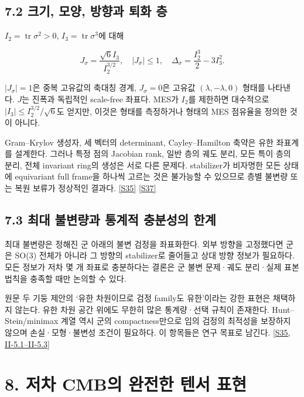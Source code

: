 \documentclass[11pt,a4paper]{article}
\begin{document}
\subsection*{7.2 크기, 모양, 방향과 퇴화 층}

\(I_2=\operatorname{tr}\sigma^2>0\), \(I_3=\operatorname{tr}\sigma^3\)에 대해


\[
J_\sigma=\frac{\sqrt6 I_3}{I_2^{3/2}},\quad |J_\sigma|\le1,
\quad \Delta_\sigma=\frac{I_2^3}{2}-3I_3^2.
\]

\(|J_\sigma|=1\)은 중복 고유값의 축대칭 경계, \(J_\sigma=0\)은 고유값 \((\lambda,-\lambda,0)\) 형태를 나타낸다. \(J\)는 진폭과 독립적인 scale-free 좌표다. MES가 \(I_2\)를 제한하면 대수적으로 \(|I_3|\le I_2^{3/2}/\sqrt6\)도 얻지만, 이것은 형태를 측정하거나 형태의 MES 점유율을 정의한 것이 아니다.


Gram–Krylov 생성자, 세 벡터의 determinant, Cayley–Hamilton 축약은 유한 좌표계를 설계한다. 그러나 특정 점의 Jacobian rank, 일반 층의 궤도 분리, 모든 특이 층의 분리, 전체 invariant ring의 생성은 서로 다른 문제다. stabilizer가 비자명한 모든 상태에 equivariant full frame을 하나씩 고르는 것은 불가능할 수 있으므로 층별 불변량 또는 복원 보류가 정상적인 결과다. \hyperlink{src:S35}{[S35]} \hyperlink{src:S37}{[S37]}


\subsection*{7.3 최대 불변량과 통계적 충분성의 한계}

최대 불변량은 정해진 군 아래의 불변 검정을 좌표화한다. 외부 방향을 고정했다면 군은 SO(3) 전체가 아니라 그 방향의 stabilizer로 줄어들고 상대 방향 정보가 필요하다. 모든 정보가 저차 몇 개 좌표로 충분하다는 결론은 군 불변 문제·궤도 분리·실제 표본법칙을 충족할 때만 논의할 수 있다.


원문 두 기둥 제안의 ‘유한 차원이므로 검정 family도 유한’이라는 강한 표현은 채택하지 않는다. 유한 차원 공간 위에도 무한히 많은 통계량·선택 규칙이 존재한다. Hunt–Stein/minimax 계열 역시 군의 compactness만으로 임의 검정의 최적성을 보장하지 않으며 손실·모형·불변성 조건이 필요하다. 이 항목들은 연구 목표로 남긴다. \hyperlink{src:S35}{[S35, II-5.1–II-5.3]}


\hypertarget{s8}{}

\section*{8. 저차 CMB의 완전한 텐서 표현}

\end{document}
